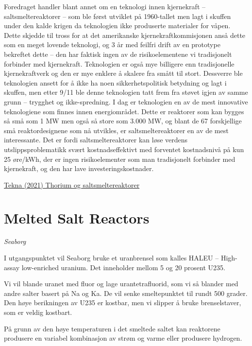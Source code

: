 \documentclass[
]{book}
\begin{document}
Foredraget handler blant annet om en teknologi innen kjernekraft -- saltsmeltereaktorer -- som ble først utviklet på 1960-tallet men lagt i skuffen under den kalde krigen da teknologien ikke produserte materialer for våpen. Dette skjedde til tross for at det amerikanske kjernekraftkommisjonen anså dette som en meget lovende teknologi, og 3 år med feilfri drift av en prototype bekreftet dette -- den har faktisk ingen av de risikoelementene vi tradisjonelt forbinder med kjernekraft. Teknologien er også mye billigere enn tradisjonelle kjernekraftverk og den er mye enklere å skalere fra smått til stort. Dessverre ble teknologien ansett for å ikke ha noen sikkerhetspolitisk betydning og lagt i skuffen, men etter 9/11 ble denne teknologien tatt frem fra støvet igjen av samme grunn -- trygghet og ikke-spredning. I dag er teknologien en av de mest innovative teknologiene som finnes innen energiområdet. Dette er reaktorer som kan bygges så små som 1 MW men også så store som 3.000 MW, og blant de 67 forskjellige små reaktordesignene som nå utvikles, er saltsmeltereaktorer en av de mest interessante. Det er fordi saltsmeltereaktorer kan løse verdens utslippsproblematikk svært kostnadseffektivt med forventet kostnadsnivå på kun 25 øre/kWh, der er ingen risikoelementer som man tradisjonelt forbinder med kjernekraft, og den har lave investeringskostnader.

\href{https://www.tekna.no/fag-og-nettverk/energi/energibloggen/thorium-og-saltsmeltereaktorer/}{Tekna (2021) Thorium og saltsmeltereaktorer}

\hypertarget{melted-salt-reactors}{%
\section{Melted Salt Reactors}\label{melted-salt-reactors}}

\emph{Seaborg}

I utgangspunktet vil Seaborg bruke et uranbrensel som kalles HALEU -- High-assay low-enriched uranium. Det inneholder mellom 5 og 20 prosent U235.

Vi vil blande uranet med fluor og lage urantetrafluorid, som vi så blander med andre salter basert på Na og Ka. De vil senke smeltepunktet til rundt 500 grader. Den høye berikningen av U235 er kostbar, men vi slipper å bruke brenselstaver, som er veldig kostbart.

På grunn av den høye temperaturen i det smeltede saltet kan reaktorene produsere en variabel kombinasjon av strøm og varme eller produsere hydrogen.
\end{document}
